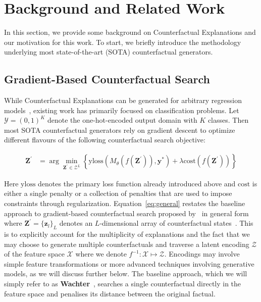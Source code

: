 \documentclass{article}
\begin{document}
\section{Background and Related Work}\label{background}

In this section, we provide some background on Counterfactual Explanations and our motivation for this work. To start, we briefly introduce the methodology underlying most state-of-the-art (SOTA) counterfactual generators.

\subsection{Gradient-Based Counterfactual Search}\label{gradient}

While Counterfactual Explanations can be generated for arbitrary regression models~\citep{spooner2021counterfactual}, existing work has primarily focused on classification problems. Let $\mathcal{Y}=(0,1)^K$ denote the one-hot-encoded output domain with $K$ classes. Then most SOTA counterfactual generators rely on gradient descent to optimize different flavours of the following counterfactual search objective:

\begin{equation} \label{eq:general}
\begin{aligned}
\mathbf{Z}^\prime &= \arg \min_{\mathbf{Z}^\prime \in \mathcal{Z}^L} \left\{  {\text{yloss}(M_{\theta}(f(\mathbf{Z}^\prime)),\mathbf{y}^*)}+ \lambda {\text{cost}(f(\mathbf{Z}^\prime)) }  \right\} 
\end{aligned} 
\end{equation}

Here $\text{yloss}$ denotes the primary loss function already introduced above and $\text{cost}$ is either a single penalty or a collection of penalties that are used to impose constraints through regularization. Equation~\ref{eq:general} restates the baseline approach to gradient-based counterfactual search proposed by~\citet{wachter2017counterfactual} in general form where $\mathbf{Z}^\prime=\{ \mathbf{z}_l\}_L$ denotes an $L$-dimensional array of counterfactual states~\citep{altmeyer2023endogenous}. This is to explicitly account for the multiplicity of explanations and the fact that we may choose to generate multiple counterfactuals and traverse a latent encoding $\mathcal{Z}$ of the feature space $\mathcal{X}$ where we denote $f^{-1}: \mathcal{X} \mapsto \mathcal{Z}$. Encodings may involve simple feature transformations or more advanced techniques involving generative models, as we will discuss further below. The baseline approach, which we will simply refer to as \textbf{Wachter}~\citep{wachter2017counterfactual}, searches a single counterfactual directly in the feature space and penalises its distance between the original factual. 
\end{document}
